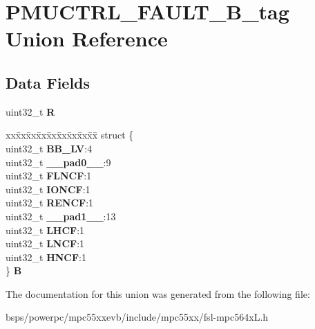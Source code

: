 \hypertarget{unionPMUCTRL__FAULT__32B__tag}{}\section{P\+M\+U\+C\+T\+R\+L\+\_\+\+F\+A\+U\+L\+T\+\_\+B\+\_\+tag Union Reference}
\label{unionPMUCTRL__FAULT__32B__tag}
\subsection*{Data Fields}
\begin{DoxyCompactItemize}
\item 
\mbox{\label{unionPMUCTRL__FAULT__32B__tag_afaca4fd31e236de5189f8c97cd536cef}} 
uint32\+\_\+t {\bfseries R}
\item 
\mbox{\label{unionPMUCTRL__FAULT__32B__tag_a5d7c26b3bfe700ab4284667a58d8b110}} 
\begin{tabbing}
xx\=xx\=xx\=xx\=xx\=xx\=xx\=xx\=xx\=\kill
struct \{\\
\>uint32\_t {\bfseries BB\_LV}:4\\
\>uint32\_t {\bfseries \_\_pad0\_\_}:9\\
\>uint32\_t {\bfseries FLNCF}:1\\
\>uint32\_t {\bfseries IONCF}:1\\
\>uint32\_t {\bfseries RENCF}:1\\
\>uint32\_t {\bfseries \_\_pad1\_\_}:13\\
\>uint32\_t {\bfseries LHCF}:1\\
\>uint32\_t {\bfseries LNCF}:1\\
\>uint32\_t {\bfseries HNCF}:1\\
\} {\bfseries B}\\

\end{tabbing}\end{DoxyCompactItemize}


The documentation for this union was generated from the following file\+:\begin{DoxyCompactItemize}
\item 
bsps/powerpc/mpc55xxevb/include/mpc55xx/fsl-\/mpc564x\+L.\+h\end{DoxyCompactItemize}
